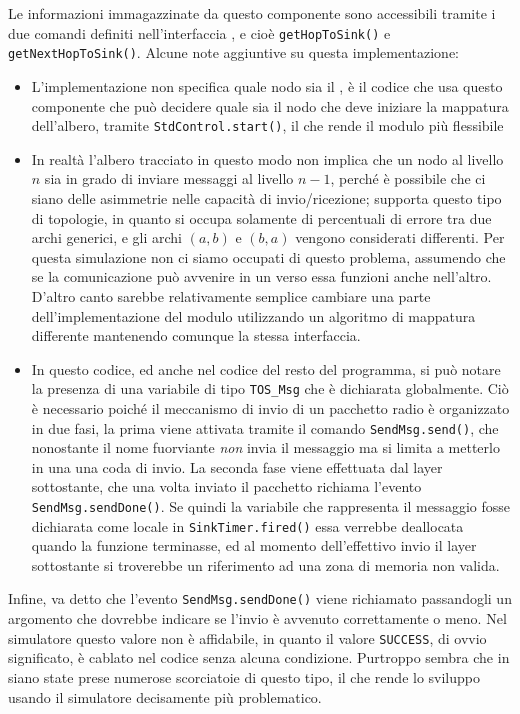 \documentclass[twoside,11pt,a4paper,italian,openany]{book}
\begin{document}
Le informazioni immagazzinate da questo componente sono accessibili tramite i due comandi 
definiti nell'interfaccia \treedata, e cioè \texttt{getHopToSink()} e \texttt{getNextHopToSink()}. 
Alcune note aggiuntive su questa implementazione:
\begin{itemize}
\item{L'implementazione non specifica quale nodo sia il \sink, è il codice che usa questo 
componente che può decidere quale sia il nodo che deve iniziare la mappatura dell'albero, 
tramite \texttt{StdControl.start()}, il che rende il modulo più flessibile}

\item{In realtà l'albero tracciato in questo modo non implica che un nodo al livello $n$ sia in 
grado di inviare messaggi al livello $n-1$, perché è possibile che ci siano delle asimmetrie 
nelle capacità di invio/ricezione; \tos supporta questo tipo di topologie, in quanto si 
occupa solamente di percentuali di errore tra due archi generici, e gli archi $(a,b)$ e $(b,a)$ 
vengono considerati differenti. Per questa simulazione non ci siamo occupati di questo problema,
assumendo che se la comunicazione può avvenire in un verso essa funzioni anche nell'altro. 
D'altro canto sarebbe relativamente semplice cambiare una parte dell'implementazione del modulo 
\tree utilizzando un algoritmo di mappatura differente mantenendo comunque la stessa 
interfaccia.}

\item{In questo codice, ed anche nel codice del resto del programma, si può notare la presenza 
di una variabile di tipo \texttt{TOS\_Msg} che è dichiarata globalmente.
Ciò è necessario poiché il meccanismo di invio di un pacchetto radio è organizzato in due fasi, 
la prima viene attivata tramite il comando \texttt{SendMsg.send()}, che nonostante il nome 
fuorviante \emph{non} invia il messaggio ma si limita a metterlo in una una coda di invio.
La seconda fase viene effettuata dal layer sottostante, che una volta inviato il pacchetto 
richiama l'evento \texttt{SendMsg.sendDone()}. 
Se quindi la variabile che rappresenta il messaggio fosse dichiarata come locale in 
\texttt{SinkTimer.fired()} essa verrebbe deallocata quando la funzione terminasse,  
ed al momento dell'effettivo invio il layer sottostante si troverebbe un riferimento 
ad una zona di memoria non valida. }
\end{itemize}

Infine, va detto che l'evento \texttt{SendMsg.sendDone()} viene richiamato passandogli un 
argomento che  dovrebbe indicare se l'invio è avvenuto correttamente o meno. 
Nel simulatore questo valore non è affidabile, in quanto il valore \texttt{SUCCESS}, di ovvio 
significato, è cablato nel codice senza alcuna condizione. 
Purtroppo sembra che in \tos siano state prese numerose scorciatoie di questo tipo, il che 
rende lo sviluppo usando il simulatore decisamente più problematico. 
\end{document}
